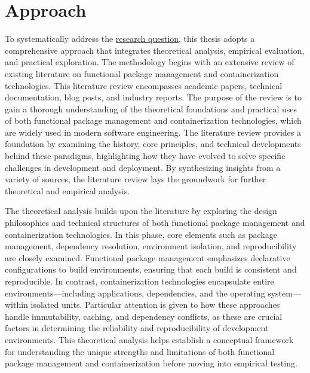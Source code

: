 \section{Approach}

To systematically address the \hyperlink{research_question}{research question}, this thesis
adopts a comprehensive approach that integrates theoretical analysis, empirical evaluation,
and practical exploration. The methodology begins with an extensive review of existing
literature on functional package management and containerization technologies. This literature
review encompasses academic papers, technical documentation, blog posts, and industry
reports. The purpose of the review is to gain a thorough understanding of the theoretical
foundations and practical uses of both functional package management and containerization
technologies, which are widely used in modern software engineering. The literature review
provides a foundation by examining the history, core principles, and technical developments
behind these paradigms, highlighting how they have evolved to solve specific challenges in
development and deployment. By synthesizing insights from a variety of sources, the literature
review lays the groundwork for further theoretical and empirical analysis.

The theoretical analysis builds upon the literature by exploring the design philosophies
and technical structures of both functional package management and containerization
technologies. In this phase, core elements such as package management, dependency resolution,
environment isolation, and reproducibility are closely examined. Functional package
management emphasizes declarative configurations to build environments, ensuring that each
build is consistent and reproducible. In contrast, containerization technologies encapsulate
entire environments—including applications, dependencies, and the operating system—within
isolated units. Particular attention is given to how these approaches handle immutability,
caching, and dependency conflicts, as these are crucial factors in determining the reliability
and reproducibility of development environments. This theoretical analysis helps establish
a conceptual framework for understanding the unique strengths and limitations of both
functional package management and containerization before moving into empirical testing.

